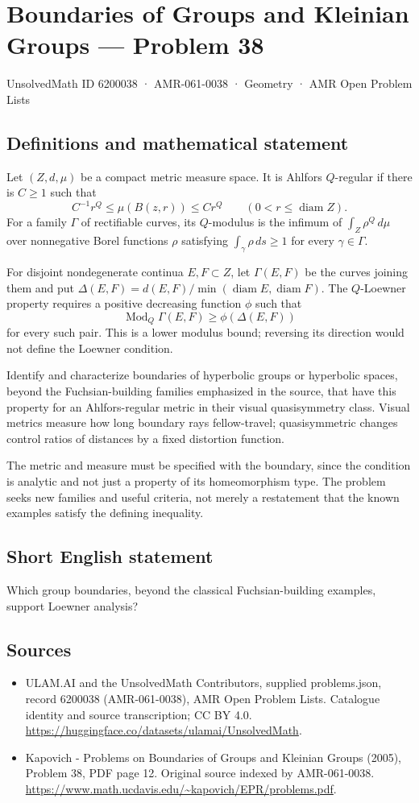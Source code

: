 \documentclass[11pt,a4paper]{article}
\begin{document}
\section*{Boundaries of Groups and Kleinian Groups — Problem 38}\label{6200038}
{\small UnsolvedMath ID 6200038 · AMR-061-0038 · Geometry · AMR Open Problem Lists}
\subsection{Definitions and mathematical statement}
Let $(Z,d,\mu)$ be a compact metric measure space. It is Ahlfors $Q$-regular if there is $C\geq1$ such that
\[
 C^{-1}r^Q\leq\mu(B(z,r))\leq Cr^Q
 \qquad(0<r\leq\operatorname{diam}Z).
\]
For a family $\Gamma$ of rectifiable curves, its $Q$-modulus is the infimum of $\int_Z\rho^Q\,d\mu$ over nonnegative Borel functions $\rho$ satisfying $\int_\gamma\rho\,ds\geq1$ for every $\gamma\in\Gamma$.

For disjoint nondegenerate continua $E,F\subset Z$, let $\Gamma(E,F)$ be the curves joining them and put $\Delta(E,F)=d(E,F)/\min(\operatorname{diam}E,\operatorname{diam}F)$. The $Q$-Loewner property requires a positive decreasing function $\phi$ such that
\[
 \operatorname{Mod}_Q\Gamma(E,F)\geq\phi(\Delta(E,F))
\]
for every such pair. This is a lower modulus bound; reversing its direction would not define the Loewner condition.

Identify and characterize boundaries of hyperbolic groups or hyperbolic spaces, beyond the Fuchsian-building families emphasized in the source, that have this property for an Ahlfors-regular metric in their visual quasisymmetry class. Visual metrics measure how long boundary rays fellow-travel; quasisymmetric changes control ratios of distances by a fixed distortion function.

The metric and measure must be specified with the boundary, since the condition is analytic and not just a property of its homeomorphism type. The problem seeks new families and useful criteria, not merely a restatement that the known examples satisfy the defining inequality.
\subsection{Short English statement}
Which group boundaries, beyond the classical Fuchsian-building examples, support Loewner analysis?
\subsection{Sources}
\begin{itemize}
\item[S1] ULAM.AI and the UnsolvedMath Contributors, supplied problems.json, record 6200038 (AMR-061-0038), AMR Open Problem Lists. Catalogue identity and source transcription; CC BY 4.0.
\url{https://huggingface.co/datasets/ulamai/UnsolvedMath}.
\item[S2] Kapovich - Problems on Boundaries of Groups and Kleinian Groups (2005), Problem 38, PDF page 12. Original source indexed by AMR-061-0038.
\url{https://www.math.ucdavis.edu/~kapovich/EPR/problems.pdf}.
\end{itemize}
\end{document}
